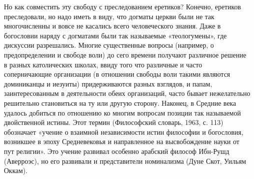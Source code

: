 Но как совместить эту свободу с преследованием еретиков? Конечно, еретиков
преследовали, но надо иметь в виду, что догматы церкви были не так
многочисленны и вовсе не касались всего человеческого знания. Даже в
богословии наряду с догматами были так называемые «теологумены», где
дискуссии разрешались. Многие существенные вопросы (например, о
предопределении и свободе воли) до сего времени получают различное решение в
разных католических школах, ввиду того что различные и часто соперничающие
организации (в отношении свободы воли такими являются доминиканцы и
иезуиты) придерживаются разных взглядов, и папам, заинтересованным в
деятельности обеих организаций, часто бывает нежелательно решительно
становиться на ту или другую сторону. Наконец, в Средние века удалось
добиться по отношению ко многим вопросам позиции так называемой
двойственной истины. Этот термин (Философский словарь, 1963, с. 113)
обозначает «учение о взаимной независимости истин философии и богословия,
возникшее в эпоху Средневековья и направленное на высвобождение науки от пут
религии». Это учение развивал особенно арабский философ Ибн-Рушд
(Аверроэс), но его развивали и представители номинализма (Дуне Скот, Уильям
Оккам).

